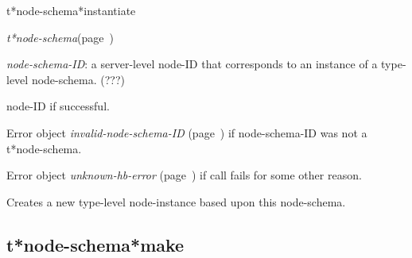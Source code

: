 \begin{description}
\item [Name:]  t*node-schema*instantiate

\item [Class:] {\sl t*node-schema}\hfill(page~\pageref{t*node-schema})

\item [Parameters:]
\item {\sl node-schema-ID}:  a server-level node-ID that corresponds to an 
instance of a type-level node-schema. (???)



\item [Return-value:] 
node-ID if successful.

Error object {\sl invalid-node-schema-ID} (page~\pageref{invalid-node-schema-ID}) if 
node-schema-ID was not a t*node-schema.

Error object {\sl unknown-hb-error} (page~\pageref{unknown-hb-error}) if call fails
for some other reason.

\item [Description:]

Creates a new type-level node-instance based upon this
node-schema.

\item [Public:]



\end{description}
\horizontalline

\subsection{t*node-schema*make}
\label{t*node-schema*make}

